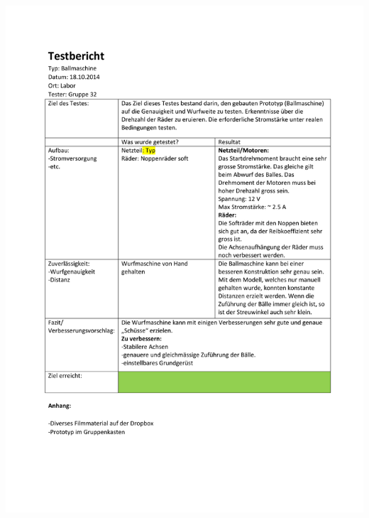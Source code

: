   	 \newpage
  	 
  	 
  	 \newpage
  	 
  	 
  	 
  	 \includegraphics[page=1,width=\textwidth]{Funktionstests/Ballmaschine.pdf}
  	 \newpage
